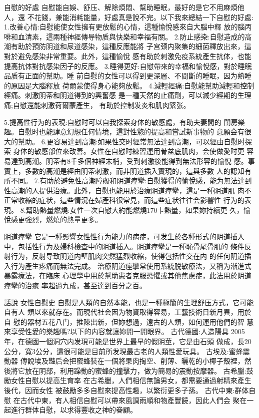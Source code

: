 \documentclass[12pt,UTF8]{ctexbook}
\begin{document}
自慰的好處
自慰能自娛、舒压、解除煩悶、幫助睡眠，最好的是它不用麻煩他人，還
不花錢，兼能消耗能量，好處真是說不完。以下我來總結一下自慰的好處:
1.改善心情:自慰能使女性擁有更放鬆的心情，這種愉悅感來自大腦中釋
放的腦丙啡和血清素，這兩種神經傳导物质與快樂和幸福有關。
2.防止感染:自慰造成的高潮有助於預防阴道和尿道感染，這種反應能將
子宫颈内聚集的細菌釋放出來，這對於避免感染非常重要。此外，這種愉悅
感有助於刺激免疫系統產生抗体，也能提高抗体對抗感染因子的反應。
3.睡得更好:自慰帶來的幸福和愉悅感，對於睡眠品质有正面的幫助。睡
前自慰的女性可以得到更深層、不間斷的睡眠，因为熟睡的原因是大腦釋放
荷爾蒙使得身心能夠放鬆。
4.減輕經痛:自慰能幫助減輕和控制經痛。刺激阴蒂和阴道得到的興奮感
是一種天然的止痛劑，可以減少經期的生理痛;自慰還能刺激荷爾蒙產生，
有助於控制发炎和肌肉緊张。

5.提高性行为的表現:自慰时可以自我探索身体的敏感處，有助夫妻間的
閨房樂趣。自慰时也能肆意幻想任何情境，這對性慾的提高和嘗試新事物的
意願会有很大的幫助。
6.更容易達到高潮:如果性交时經常無法達到高潮，可以經由自慰时探索
身体的敏感部位來改善。女性在自慰时練習運用骨盆底肌肉，会使做愛时更
容易達到高潮。阴蒂有8千多個神經末梢，受到刺激後能得到無法形容的愉悅
感。事實上，多數的高潮是經由阴蒂刺激，而非阴道插入實現的，這與多數
人的認知有所不同。
7.有助於避免性高潮障礙和阴道痙攣:自慰獲得的愉悅感，能为無法達到
性高潮的人提供治療。此外，自慰也能用於治療阴道痙攣，這是一種阴道肌
肉不正常收縮的症状，這些情況在婦產科很常見，而這些症状往往会影響性
行为的表現。
8.幫助熱量燃燒:女性一次自慰大約能燃燒170卡熱量，如果妳持續更
久，愉悅感更強烈，燃燒的熱量更多。

阴道痙攣
它是一種影響女性性行为能力的病症，可发生於各種形式的阴道插入
中，包括性行为及婦科檢查中的阴道插入。阴道痙攣是一種恥骨尾骨肌的
條件反射行为，反射导致阴道内壁肌肉突然猛烈收縮，使得包括性交在内
的任何阴道插入行为產生疼痛而無法完成。
治療阴道痙攣常使用系統脱敏療法，又稱为漸進式暴露療法，在臨床
心理學中用於幫助患者克服恐懼或其他焦慮症，此法用於阴道痙攣的治癒
率超過九成，甚至達到百分之百。

話說
女性自慰史
自慰是人類的自然本能，也是一種極簡的生理舒压方式，它可能自有人
類以來就存在。而現代社会因为物資取得容易，工藝技術日新月異，用於自
慰的器材五花八门，推陳出新，但妳想過，遠古的人類，如何運用他們的智
慧來享受性愛的樂趣嗎?以下的内容就讓妳開一開眼界。
古代德國:人造陽具
2005年，在德國一個洞穴内发現可能是世界上最早的假阴莖，它是由石頭
做成，長20公分，寬3公分，這很可能是目前所发現最古老的人類性愛玩具。
古埃及:蜜蜂震動器
傳說埃及豔后会把蜜蜂裝在一個將果肉掏空、削薄、曬乾的小椰子殼裡，然後將它放在阴部，利用躁動的蜜蜂的撞擊力，做为簡易的震動按摩器。
古希臘:鼓勵女性自慰以提高生育率
在古希臘，人們相信無論男女，都需要通過射精來產生後代，因而女性
被鼓勵多多自慰來提高性趣，以繁衍更多子孫。
古代中東:群体自慰
在古代中東，有人相信自慰可以帶來風調雨順和物產豐饒，因此人們会
聚在一起進行群体自慰，以求得豐收之神的眷顧。
\end{document}
